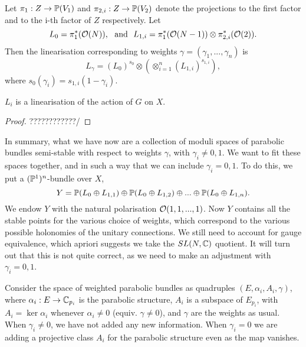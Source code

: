 	
	Let $\pi_1:Z \to \mathbb{P}(V_1)$ and $\pi_{2,i}:Z\to \mathbb{P}(V_2)$ denote the projections to the first factor and to the i-th factor of $Z$ respectively. Let
	\begin{equation}
		L_0 = \pi_1^\ast(\mathcal{O}(N)),~ \text{ and } ~ L_{1,i} = \pi_1^\ast(\mathcal{O}(N-1))\otimes \pi_{2,i}^\ast (\mathcal{O}(2)).
	\end{equation}
	Then the linearisation corresponding to weights $\gamma = (\gamma_1,...,\gamma_n)$ is 
	\begin{equation}
		L_\gamma = (L_0)^{s_0} \otimes \left(
		\otimes_{i=1}^n (L_{1,i})^{s_{1,i}}
		\right),
	\end{equation}
	where $s_0(\gamma_i) = s_{1,i}(1-\gamma_i)$.
	\begin{lemma}
		$L_i$ is a linearisation of the action of $G$ on $X$.
	\end{lemma}
	\begin{proof}
		????????????/
	\end{proof}
	In summary, what we have now are a collection of moduli spaces of parabolic bundles semi-stable with respect to weights $\gamma$, with $\gamma_i \neq 0,1$. We want to fit these spaces together, and in such a way that we can include $\gamma_i = 0,1$. To do this, we put a $(\mathbb{P}^1)^n$-bundle over $X$,
	\begin{equation}
		Y = \mathbb{P}(L_0\oplus L_{1,1})\oplus \mathbb{P}(L_0\oplus L_{1,2})\oplus ... \oplus \mathbb{P}(L_0\oplus L_{1,n}).
	\end{equation}
	We endow $Y$ with the natural polarisation $\mathcal{O}(1,1,...,1)$. Now $Y$ contains all the stable points for the various choice of weights, which correspond to the various possible holonomies of the unitary connections. We still need to account for gauge equivalence, which apriori suggests we take the $SL(N,\mathbb{C})$ quotient. It will turn out that this is not quite correct, as we need to make an adjustment with $\gamma_i = 0,1$.
	
	Consider the space of weighted parabolic bundles as quadruples $(E, \alpha_i, A_i, \gamma)$, where $\alpha_i:E\to \mathbb{C}_{p_i}$ is the parabolic structure, $A_i$ is a subspace of $E_{p_i}$, with $A_i = \ker\alpha_i$ whenever $\alpha_i \neq 0$ (equiv. $\gamma \neq 0$), and $\gamma$ are the weights as usual. When $\gamma_i \neq 0$, we have not added any new information. When $\gamma_i = 0$ we are adding a projective class $A_i$ for the parabolic structure even as the map vanishes.
	
